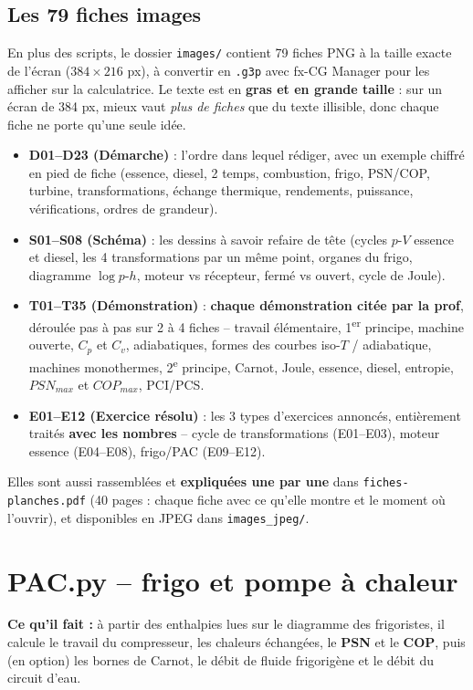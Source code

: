 \documentclass[10.5pt,a4paper]{article}
\begin{document}
\subsection*{Les 79 fiches images}
En plus des scripts, le dossier \texttt{images/} contient 79 fiches PNG à la taille exacte de l'écran
($384\times216$ px), à convertir en \texttt{.g3p} avec fx-CG Manager pour les afficher sur la
calculatrice. Le texte est en \textbf{gras et en grande taille} : sur un écran de 384 px, mieux vaut
\emph{plus de fiches} que du texte illisible, donc chaque fiche ne porte qu'une seule idée.
\begin{itemize}[leftmargin=1.4em,nosep]
\item \textbf{D01--D23 (Démarche)} : l'ordre dans lequel rédiger, avec un exemple chiffré en pied de fiche
(essence, diesel, 2 temps, combustion, frigo, PSN/COP, turbine, transformations, échange thermique,
rendements, puissance, vérifications, ordres de grandeur).
\item \textbf{S01--S08 (Schéma)} : les dessins à savoir refaire de tête (cycles $p$-$V$ essence et diesel,
les 4 transformations par un même point, organes du frigo, diagramme $\log p$-$h$, moteur vs récepteur,
fermé vs ouvert, cycle de Joule).
\item \textbf{T01--T35 (Démonstration)} : \textbf{chaque démonstration citée par la prof}, déroulée pas à
pas sur 2 à 4 fiches -- travail élémentaire, 1\textsuperscript{er} principe, machine ouverte, $C_p$ et
$C_v$, adiabatiques, formes des courbes iso-$T$ / adiabatique, machines monothermes, 2\textsuperscript{e}
principe, Carnot, Joule, essence, diesel, entropie, $PSN_{max}$ et $COP_{max}$, PCI/PCS.
\item \textbf{E01--E12 (Exercice résolu)} : les 3 types d'exercices annoncés, entièrement traités
\textbf{avec les nombres} -- cycle de transformations (E01--E03), moteur essence (E04--E08),
frigo/PAC (E09--E12).
\end{itemize}
Elles sont aussi rassemblées et \textbf{expliquées une par une} dans \texttt{fiches-planches.pdf}
(40 pages : chaque fiche avec ce qu'elle montre et le moment où l'ouvrir), et disponibles en JPEG dans
\texttt{images\_jpeg/}.

\newpage
\section{PAC.py -- frigo et pompe à chaleur}

\begin{objectif}
\textbf{Ce qu'il fait :} à partir des enthalpies lues sur le diagramme des frigoristes, il calcule le
travail du compresseur, les chaleurs échangées, le \textbf{PSN} et le \textbf{COP}, puis (en option) les
bornes de Carnot, le débit de fluide frigorigène et le débit du circuit d'eau.
\end{objectif}
\end{document}
